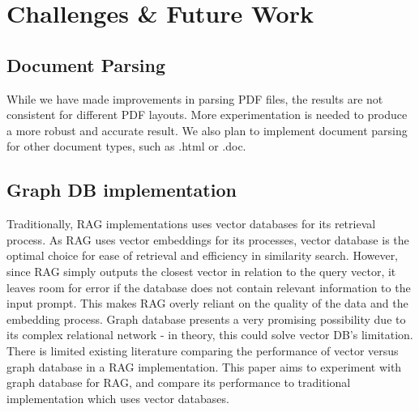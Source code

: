 \documentclass{scrartcl}
\begin{document}

\section{Challenges & Future Work}

\subsection{Document Parsing}

While we have made improvements in parsing PDF files, the results are not consistent for different PDF layouts. More experimentation is needed to produce a more robust and accurate result.
We also plan to implement document parsing for other document types, such as .html or .doc.

\subsection{Graph DB implementation}

Traditionally, RAG implementations uses vector databases for its retrieval process. As RAG uses vector embeddings for its processes, vector database is the optimal choice for ease of retrieval and efficiency in similarity search.
However, since RAG simply outputs the closest vector in relation to the query vector, it leaves room for error if the database does not contain relevant information to the input prompt. This makes RAG overly reliant on the quality of the data and the embedding process.
Graph database presents a very promising possibility due to its complex relational network - in theory, this could solve vector DB's limitation.
There is limited existing literature comparing the performance of vector versus graph database in a RAG implementation. This paper aims to experiment with graph database for RAG, and compare its performance to traditional implementation which uses vector databases.







\end{document}
